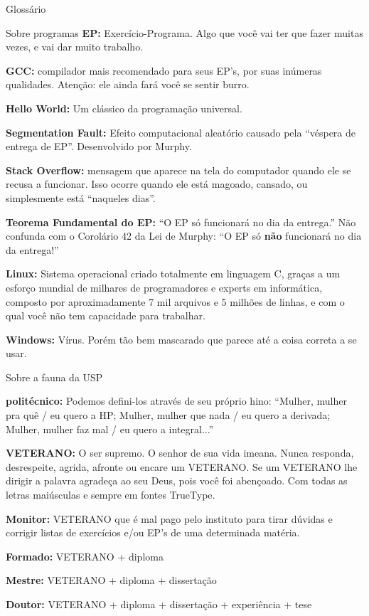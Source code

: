 \begin{secao}{Glossário}
\begin{subsecao}{Sobre programas}
{\bf EP:} Exercício-Programa. Algo que você vai ter que fazer muitas vezes, e
vai dar muito trabalho.

{\bf GCC:} compilador mais recomendado para seus EP's, por suas inúmeras
qualidades. Atenção: ele ainda fará você se sentir burro.

{\bf Hello World:} Um clássico da programação universal.

{\bf Segmentation Fault:} Efeito computacional aleatório causado pela ``véspera
de entrega de EP''. Desenvolvido por Murphy.

{\bf Stack Overflow:} mensagem que aparece na tela do computador
quando ele se recusa a funcionar. Isso ocorre quando ele está magoado, cansado,
ou simplesmente está ``naqueles dias''.

{\bf Teorema Fundamental do EP:} ``O EP só funcionará no dia da entrega.'' Não
confunda com o Corolário 42 da Lei de Murphy: ``O EP só {\bf não} funcionará no
dia da entrega!''

{\bf Linux:} Sistema operacional criado totalmente em linguagem C, graças a um
esforço mundial de milhares de programadores e experts em informática, composto
por aproximadamente 7 mil arquivos e 5 milhões de linhas, e com o qual você não
tem capacidade para trabalhar.

{\bf Windows:} Vírus. Porém tão bem mascarado que parece até a coisa correta a
se usar.
\end{subsecao}

\begin{subsecao}{Sobre a fauna da USP}

{\bf politécnico:} Podemos defini-los através de seu próprio hino: ``Mulher,
mulher pra quê / eu quero a HP; Mulher, mulher que nada / eu quero a derivada;
Mulher, mulher faz mal / eu quero a integral...''

{\bf VETERANO:} O ser supremo. O senhor de sua vida imeana. Nunca responda,
desrespeite, agrida, afronte ou encare um VETERANO. Se um VETERANO lhe dirigir
a palavra agradeça ao seu Deus, pois você foi abençoado. Com todas as letras
maiúsculas e sempre em fontes TrueType.

{\bf Monitor:} VETERANO que é mal pago pelo instituto para tirar dúvidas e
corrigir listas de exercícios e/ou EP's de uma determinada matéria.

{\bf Formado:} VETERANO + diploma

{\bf Mestre:} VETERANO + diploma + dissertação

{\bf Doutor:} VETERANO + diploma + dissertação + experiência + tese


\end{subsecao}
\end{secao}
